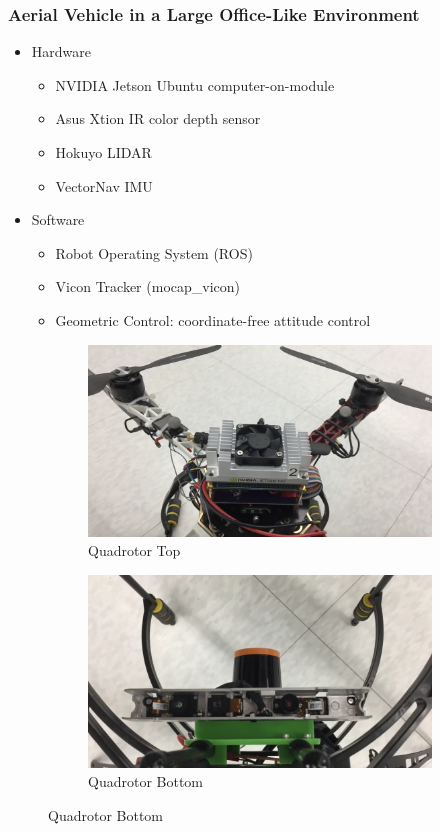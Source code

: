 \documentclass[11pt,professionalfonts,hyperref={pdftex,pdfpagemode=none,pdfstartview=FitH}]{beamer}
\begin{document}
\begin{frame}
\frametitle{Aerial Vehicle in a Large Office-Like Environment}
\begin{itemize}
        	\item Hardware
	\begin{itemize}
		\item NVIDIA Jetson Ubuntu computer-on-module
		\item Asus Xtion IR color depth sensor
		\item Hokuyo LIDAR
		\item VectorNav IMU
	\end{itemize}
	\item Software
	\begin{itemize}
		\item Robot Operating System (ROS)
		\item Vicon Tracker (mocap\_vicon)
		\item Geometric Control: coordinate-free attitude control
	\end{itemize}
\end{itemize}
\begin{figure}
  \centering
  \begin{subfigure}[t]{.4\linewidth}
    \centering\includegraphics[height=.5\linewidth]{quad_top.png}
    \caption*{Quadrotor Top}
  \end{subfigure}
  \begin{subfigure}[t]{.4\linewidth}
    \centering\includegraphics[height=.5\linewidth]{quad_bottom.png}
    \caption*{Quadrotor Bottom}
  \end{subfigure}
\end{figure}
\end{frame}
\end{document}
